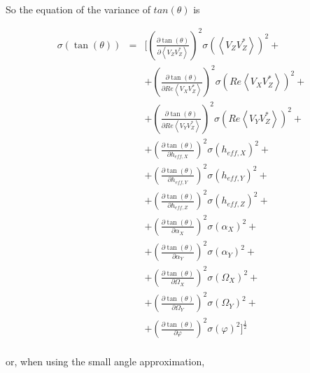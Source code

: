 \documentclass[a4paper,10pt]{thesis}
\begin{document}
\paragraph*{}
So the equation of the variance of $tan(\theta)$ is

\begin{eqnarray}
\sigma (\tan (\theta)) &=&  [(\frac{\partial \tan (\theta)}{\partial \left\langle V_Z V_Z^{*}\right\rangle})^2 \sigma ( \left\langle V_Z V_Z^{*}\right\rangle)^2+\\
&&+ (\frac{\partial \tan (\theta)}{\partial Re \left\langle V_X V_Z^{*}\right\rangle})^2 \sigma (Re \left\langle V_X V_Z^{*}\right\rangle)^2 +\nonumber \\
&&+ (\frac{\partial \tan (\theta)}{\partial Re \left\langle V_Y V_Z^{*}\right\rangle})^2 \sigma (Re \left\langle V_Y V_Z^{*}\right\rangle)^2 +\nonumber \\
&&+ (\frac{\partial \tan (\theta)}{\partial h_{eff,X}})^2 \sigma (h_{eff,X})^2+ \nonumber \\
&&+ (\frac{\partial \tan (\theta)}{\partial h_{eff,Y}})^2 \sigma (h_{eff,Y})^2+ \nonumber \\
&&+ (\frac{\partial \tan (\theta)}{\partial h_{eff,Z}})^2 \sigma (h_{eff,Z})^2+ \nonumber \\
&&+ (\frac{\partial \tan (\theta)}{\partial \alpha_X})^2 \sigma (\alpha_X)^2+ \nonumber \\
&&+ (\frac{\partial \tan (\theta)}{\partial \alpha_Y})^2 \sigma (\alpha_Y)^2+ \nonumber \\
&&+ (\frac{\partial \tan (\theta)}{\partial \Omega_X})^2 \sigma (\Omega_X)^2+ \nonumber \\
&&+ (\frac{\partial \tan (\theta)}{\partial \Omega_Y})^2 \sigma (\Omega_Y)^2+ \nonumber \\
&&+ (\frac{\partial \tan (\theta)}{\partial \varphi})^2 \sigma (\varphi)^2 ]^\frac{1}{2}\nonumber
\end{eqnarray}

\paragraph*{}
or, when using the small angle approximation,
\end{document}
